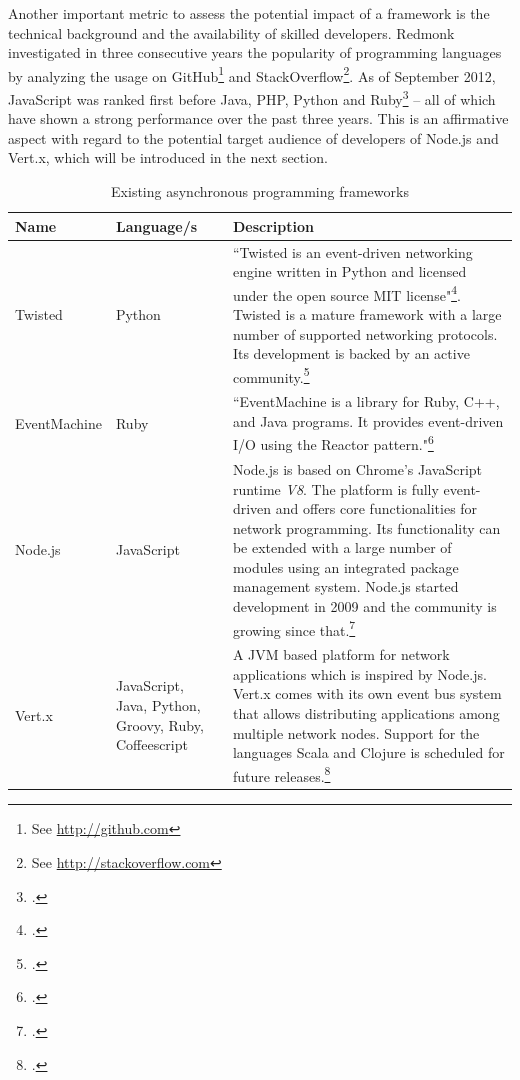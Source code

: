 Another important metric to assess the potential impact of a framework is the
technical background and the availability of skilled developers. Redmonk
investigated in three consecutive years the popularity of programming languages
by analyzing the usage on GitHub\footnote{See \url{http://github.com}} and
StackOverflow\footnote{See \url{http://stackoverflow.com}}. As of September
2012, JavaScript was ranked first before Java, PHP, Python and
Ruby\footcite[Cf.][]{Redmonk_2012} – all of which have shown a strong
performance over the past three years. This is an affirmative aspect with regard
to the potential target audience of developers of Node.js and Vert.x, which will
be introduced in the next section.


\begin{savenotes} %
\begin{table}[htbp]
\begin{tabular*}{\textwidth}{p{} p{} p{}}
\toprule
\textbf{Name} & \textbf{Language/s} & \textbf{Description} \\
\midrule 
Twisted			& Python			& ``Twisted is an event-driven networking engine written in 
									  Python and licensed under the open source MIT license"\footcite[Cf.][]{Twisted_2012}.
									  Twisted is a mature framework with a large number of supported networking
									  protocols. Its development is backed by an active
									  community.\footcite[Cf.][12]{fettig_2005}
									  \\
									  
EventMachine 	& Ruby    			& ``EventMachine is a library for Ruby, C++, and Java
									  programs. It provides event-driven I/O using the Reactor 
									  pattern."\footcite[]{eventmachine_2012}\\

Node.js			& JavaScript		& Node.js is based on Chrome's JavaScript runtime \textit{V8}.
									  The platform is fully event-driven and offers core
									  functionalities for network programming. Its functionality
									  can be extended with a large number of modules using an
									  integrated package management system.
									  Node.js started development in 2009 and the community
									  is growing since that.\footcite[Cf.][]{Mashtable_2011}\\
									  
Vert.x			& JavaScript, Java, Python, Groovy, Ruby, Coffeescript		
									& A JVM based platform for network applications which is
									  inspired by Node.js. Vert.x comes with its own event
									  bus system that allows distributing applications
									  among multiple network nodes. Support for the languages
									  Scala and Clojure is scheduled for future releases.\footcite[Cf.][]{vertx_2012}\\
\bottomrule 
\end{tabular*}
  \caption{Existing asynchronous programming frameworks}
  \label{tab:existing_frameworks}
\end{table}
\end{savenotes}

